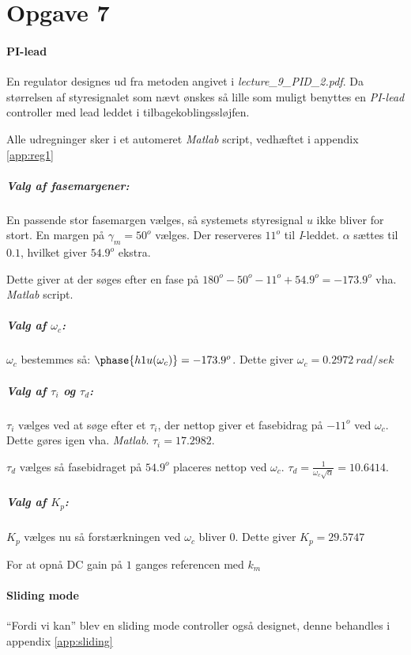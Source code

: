 \section{Opgave 7}
\paragraph{ PI-lead }
En regulator designes ud fra metoden angivet i \emph{lecture\_9\_PID\_2.pdf}. Da
størrelsen af styresignalet som nævt ønskes så lille som muligt benyttes en
\emph{PI-lead} controller med lead leddet i tilbagekoblingssløjfen.

Alle udregninger sker i et automeret \emph{Matlab} script, vedhæftet i appendix
\ref{app:reg1}

\subparagraph{Valg af fasemargener:}
	En passende stor fasemargen vælges, så systemets styresignal $u$ ikke bliver
	for stort. En margen på $\gamma_m = 50^o$ vælges.
	Der reserveres $11^o$ til \emph{I}-leddet.
	$\alpha$ sættes til $0.1$, hvilket giver $54.9^o$ ekstra.
	
	Dette giver at der søges efter en fase på $180^o - 50^o - 11^o + 54.9^o =
	-173.9^o$ vha. \emph{Matlab} script.
\subparagraph{Valg af $\omega_c$:}
	$\omega_c$ bestemmes så: $\phase{h1u(\omega_c)} = -173.9^o$. Dette giver
	$\omega_c =  0.2972~rad/sek$
\subparagraph{Valg af $\tau_i$ og $\tau_d$:}
	$\tau_i$ vælges ved at søge efter et $\tau_i$, der nettop giver et fasebidrag
	på $-11^o$ ved $\omega_c$. Dette gøres igen vha. \emph{Matlab}. $\tau_i =
	17.2982$.
	
	$\tau_d$ vælges så fasebidraget på $54.9^o$ placeres nettop ved $\omega_c$.
	$\tau_d = \frac{1}{\omega_c \sqrt{\alpha}} = 10.6414$.
\subparagraph{Valg af $K_p$:}
	$K_p$ vælges nu så forstærkningen ved $\omega_c$ bliver 0.
	Dette giver $K_p = 29.5747$
	
	For at opnå DC gain på $1$ ganges referencen med $k_m$
	
\paragraph{ Sliding mode }
	``Fordi vi kan'' blev en sliding mode controller også designet, denne
	behandles i appendix \ref{app:sliding}
